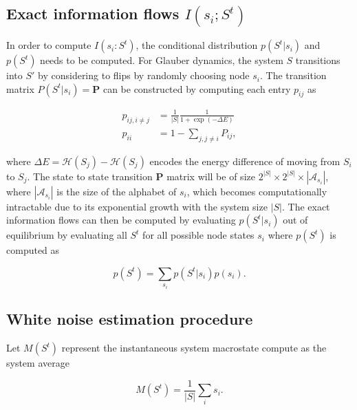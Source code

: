 \documentclass[a4paper, 11pt, twocolumn]{article}
\newcommand{\m}[1]{\textbf{#1}}
\newcommand{\infdecay}{I(s_i : S^t)}
\begin{document}
\subsection{Exact information flows $I(s_i ; S^t)$}
\label{sec:org59af222}
In   order   to   compute   $\infdecay$,   the   conditional
distribution  $p(S^t  |  s_i)$  and  $p(S^t)$  needs  to  be
computed. For  Glauber dynamics, the system  $S$ transitions
into $S'$ by considering to  flips by randomly choosing node $s_i$. The  transition matrix $P(S^t |  s_i) = \m P$  can be
constructed by computing each entry $p_{ij}$ as

\begin{equation}
\label{eq:glauber}
\begin{split}
p_{ij, i \neq j} &= \frac{1}{|S|} \frac{1}{ 1 + \exp (-\Delta E) }\\
p_{ii} &= 1 - \sum_{j, j \neq i} P_{ij},
\end{split}
\end{equation}

where $\Delta E =  \mathcal{H}(S_j) - \mathcal{H}(S_j)$ encodes the
energy difference of  moving from $S_i$ to  $S_j$. The state
to state transition $\m P$ matrix will be of size $2^{|S|} \times
2^{|S|} \times |\mathcal{A}_{s_i}|$, where $|\mathcal{A}_{s_i}|$ is the size of
the alphabet of $s_i$, which becomes computationally intractable due
to its  exponential growth with  the system size  $|S|$. The
exact information  flows can then be  computed by evaluating
$p(S^t |  s_i)$ out of  equilibrium by evaluating  all $S^t$
for  all  possible  node  states  $s_i$  where  $p(S^t)$  is
computed as

\begin{equation}
p(S^t) = \sum_{s_i} p(S^t | s_i ) p(s_i).
\end{equation}

\subsection{White noise estimation procedure}
\label{sec:orgc093508}
Let $M(S^t)$  represent the instantaneous  system macrostate
compute as the system average

\begin{equation}
\label{}
M(S^t) = \frac{1}{|S|} \sum_i s_i.
\end{equation}
\end{document}
